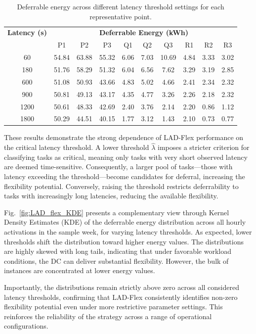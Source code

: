 \documentclass[preprint,12pt]{elsarticle}
\begin{document}
\begin{table}[h!]
\centering
\renewcommand{\arraystretch}{1.2}
\begin{tabular}{@{}c|ccc|ccc|ccc@{}}
\toprule
\textbf{Latency (s)} & \multicolumn{9}{c}{\textbf{Deferrable Energy (kWh)}} \\
                     & P1 & P2 & P3 & Q1 & Q2 & Q3 & R1 & R2 & R3 \\
\midrule
60   & 54.84 & 63.88 & 55.32 & 6.06 & 7.03 & 10.69 & 4.84 & 3.33 & 3.02 \\
180  & 51.76 & 58.29 & 51.32 & 6.04 & 6.56 & 7.62  & 3.29 & 3.19 & 2.85 \\
600  & 51.08 & 50.93 & 43.66 & 4.83 & 5.02 & 4.66  & 2.41 & 2.34 & 2.32 \\
900  & 50.81 & 49.13 & 43.17 & 4.35 & 4.77 & 3.26  & 2.26 & 2.18 & 2.32 \\
1200 & 50.61 & 48.33 & 42.69 & 2.40 & 3.76 & 2.14  & 2.20 & 0.86 & 1.12 \\
1800 & 50.29 & 44.51 & 40.15 & 1.77 & 3.12 & 1.43  & 2.10 & 0.73 & 0.77 \\
\bottomrule
\end{tabular}
\caption{Deferrable energy across different latency threshold settings for each representative point.}
\label{tab:deferrable_energy_latency}
\end{table}

These results demonstrate the strong dependence of LAD-Flex performance on the critical latency threshold. A lower threshold $\hat{\lambda}$ imposes a stricter criterion for classifying tasks as critical, meaning only tasks with very short observed latency are deemed time-sensitive. Consequently, a larger pool of tasks—those with latency exceeding the threshold—become candidates for deferral, increasing the flexibility potential. Conversely, raising the threshold restricts deferrability to tasks with increasingly long latencies, reducing the available flexibility.

Fig.~\ref{fig:LAD_flex_KDE} presents a complementary view through Kernel Density Estimates (KDE) of the deferrable energy distribution across all hourly activations in the sample week, for varying latency thresholds. As expected, lower thresholds shift the distribution toward higher energy values. The distributions are highly skewed with long tails, indicating that under favorable workload conditions, the DC can deliver substantial flexibility. However, the bulk of instances are concentrated at lower energy values.

Importantly, the distributions remain strictly above zero across all considered latency thresholds, confirming that LAD-Flex consistently identifies non-zero flexibility potential even under more restrictive parameter settings. This reinforces the reliability of the strategy across a range of operational configurations.
\end{document}
